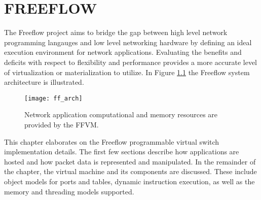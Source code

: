 \chapter{FREEFLOW}
\label{ff}
The Freeflow project aims to bridge the gap between high level network
programming langauges and low level networking hardware by defining an ideal
execution environment for network applications. Evaluating the benefits and
deficits with respect to flexibility and performance provides a more accurate
level of virtualization or materialization to utilize. In Figure \ref{ff_arch}
the Freeflow system architecture is illustrated.

\begin{figure}[h]
\centering
\texttt{[image: ff\_arch]}
\caption{Network application computational and memory resources are provided
by the FFVM.}
\label{ff_arch}
\end{figure}

This chapter elaborates on the Freeflow programmable virtual switch
implementation details. The first few sections describe how applications are
hosted and how packet data is represented and manipulated. In the remainder of
the chapter, the virtual machine and its components are discussed. These include
object models for ports and tables, dynamic instruction execution, as well as
the memory and threading models supported.

%
%

